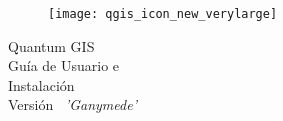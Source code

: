 \begin{titlepage}
\begin{center}

\begin{figure}[H]
\begin{center}
\texttt{[image: qgis\_icon\_new\_verylarge]} 
\end{center}
\end{figure}

\Huge{Quantum GIS}\\
\vspace{0.5cm}
\Large{Guía de Usuario e \\Instalación} \\
\vspace{0.5cm}
\large{Versión ~\CURRENT \textsl{'Ganymede'}}


\end{center}
\end{titlepage}

